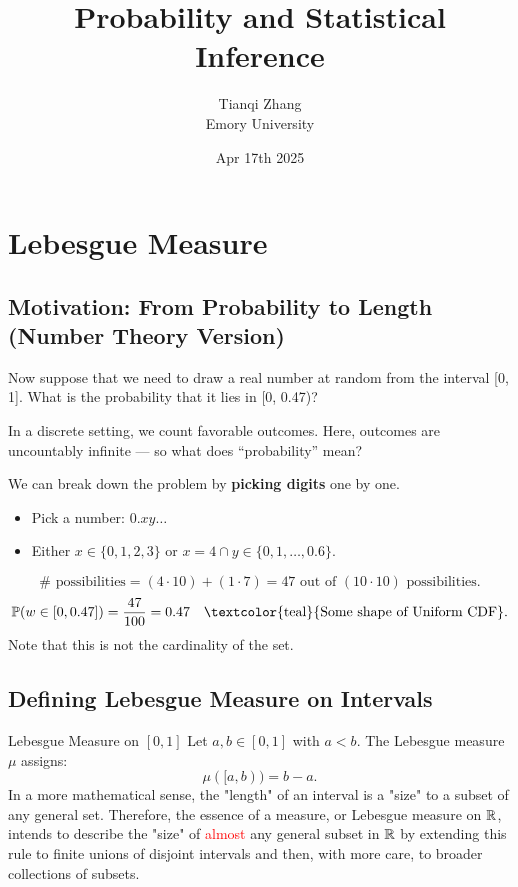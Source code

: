 

\title{\textbf{%
               Probability and Statistical Inference}}
\author{Tianqi Zhang\\
Emory University}
\date{Apr 17th 2025}


\maketitle
\setcounter{tocdepth}{1} %

\setcounter{section}{3}
\section{Lebesgue Measure}
\subsection{Motivation: From Probability to Length (Number Theory Version)}
Now suppose that we need to draw a real number at random from the interval [0, 1]. What is the probability that it lies in [0, 0.47)?

In a discrete setting, we count favorable outcomes. Here, outcomes are uncountably infinite — so what does “probability” mean?

We can break down the problem by \textbf{picking digits} one by one. 
\begin{itemize}
    \item Pick a number: \(0.xy\ldots\)
    \item Either \(x \in \{0,1,2,3\}\) or \(x = 4 \cap y \in \{0, 1, \ldots, 0.6\}\).
\end{itemize}
\[
\#\text{ possibilities} = (4 \cdot 10) + (1 \cdot 7) = 47 \text{ out of } (10 \cdot 10) \text{ possibilities}.
\]
\[
\mathbb{P}(w \in [0,0.47]) = \frac{47}{100} = 0.47 \quad \text{\textcolor{teal}{Some shape of Uniform CDF}}.
\]
Note that this is not the cardinality of the set. 
\subsection{Defining Lebesgue Measure on Intervals}
\begin{df}{Lebesgue Measure on \([0, 1]\)}
Let \( a, b \in [0, 1] \) with \( a < b \). The Lebesgue measure \( \mu \) assigns:
\[
\mu([a, b)) = b - a.
\]
In a more mathematical sense, the "length" of an interval is a "size" to a subset of any general set. Therefore, the essence of a measure, or Lebesgue measure on ${\mathbb{R}}$, intends to describe the "size" of \textcolor{red}{almost} any general subset in ${\mathbb{R}}$ by extending this rule to finite unions of disjoint intervals and then, with more care, to broader collections of subsets.
\end{df}


